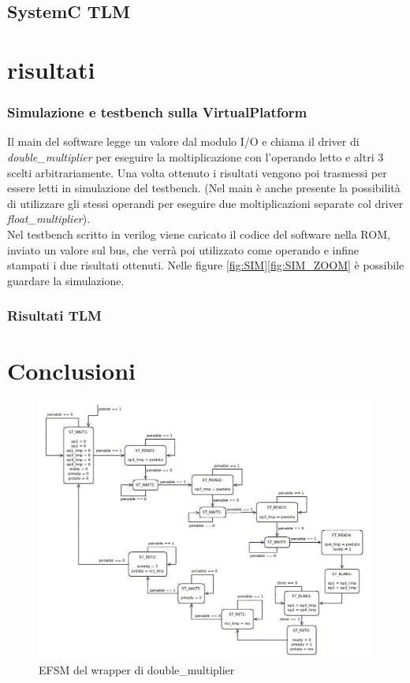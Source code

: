 \documentclass[]{IEEEtran}
\begin{document}
\subsection{SystemC TLM}



\section{risultati}

\subsubsection{Simulazione e testbench sulla VirtualPlatform}
Il main del software legge un valore dal modulo I/O e chiama il driver di \textit{double\_multiplier} per eseguire la moltiplicazione con l'operando letto e altri 3 scelti arbitrariamente. Una volta ottenuto i risultati vengono poi trasmessi per essere letti in simulazione del testbench. (Nel main è anche presente la possibilità di utilizzare gli stessi operandi per eseguire due moltiplicazioni separate col driver \textit{float\_multiplier}).
\\Nel testbench scritto in verilog viene caricato il codice del software nella ROM, inviato un valore sul bus, che verrà poi utilizzato come operando e infine stampati i due risultati ottenuti. Nelle figure \ref{fig:SIM}\ref{fig:SIM_ZOOM} è possibile guardare la simulazione.


\subsubsection{Risultati TLM}





\section{Conclusioni}



\nocite{*}


\appendix


\begin{figure}[!htb]
    \centering
    \includegraphics[width=0.4\columnwidth]{figures/EFSM_wrapper.png}
    \caption{EFSM del wrapper di double\_multiplier}
    \label{fig:EFSM_WRAPPER}
\end{figure}
\end{document}

